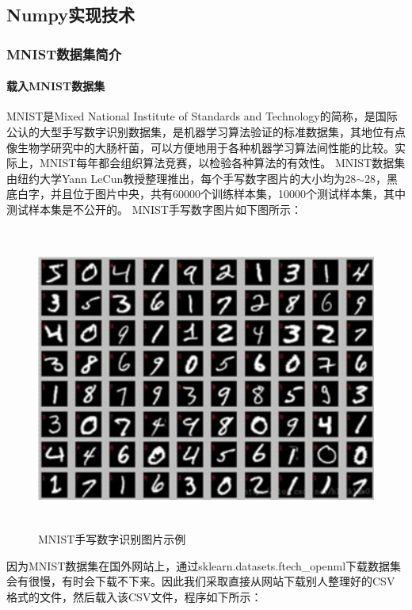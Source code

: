 \documentclass[UTF8]{article}
\begin{document}
\subsection{Numpy实现技术}
\subsubsection{MNIST数据集简介}
\paragraph{载入MNIST数据集}
MNIST是Mixed National Institute of Standards and Technology的简称，是国际公认的大型手写数字识别数据集，是机器学习算法验证的标准数据集，其地位有点像生物学研究中的大肠杆菌，可以方便地用于各种机器学习算法间性能的比较。实际上，MNIST每年都会组织算法竞赛，以检验各种算法的有效性。\newline
MNIST数据集由纽约大学Yann LeCun教授整理推出，每个手写数字图片的大小均为28$\sim$28，黑底白字，并且位于图片中央，共有60000个训练样本集，10000个测试样本集，其中测试样本集是不公开的。\newline
MNIST手写数字图片如下图所示：
\begin{figure}[H]
	\caption{MNIST手写数字识别图片示例}
	\label{f000030001}
	\centering
	\includegraphics[height=10cm]{images/f000030}
\end{figure}
因为MNIST数据集在国外网站上，通过sklearn.datasets.ftech\_openml下载数据集会有很慢，有时会下载不下来。因此我们采取直接从网站下载别人整理好的CSV格式的文件，然后载入该CSV文件，程序如下所示：
\end{document}
